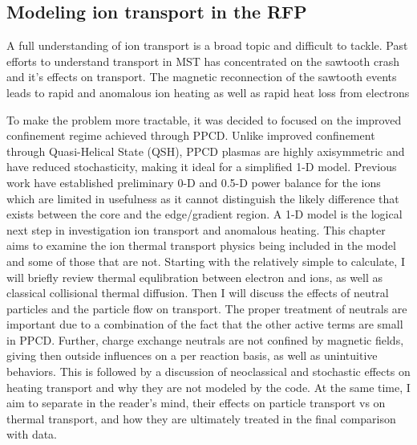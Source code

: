 \begin{refsection}


\chapter{Modeling ion transport in the RFP}\label{ch:physics}


A full understanding of ion transport is a broad topic and difficult to tackle. Past efforts to understand transport in MST has concentrated on the sawtooth crash and it's effects on transport. The magnetic reconnection of the sawtooth events leads to rapid and anomalous ion heating as well as rapid heat loss from electrons\cite{Chapman2010}

To make the problem more tractable, it was decided to focused on the improved confinement regime achieved through PPCD. Unlike improved confinement through Quasi-Helical State (QSH), PPCD plasmas are highly axisymmetric and have reduced stochasticity, making it ideal for a simplified 1-D model. Previous work have established preliminary 0-D and 0.5-D power balance for the ions\cite{??} which are limited in usefulness as it cannot distinguish the likely difference that exists between the core and the edge/gradient region. A 1-D model is the logical next step in investigation ion transport and anomalous heating. This chapter aims to examine the ion thermal transport physics being included in the model and some of those that are not. Starting with the relatively simple to calculate, I will briefly review thermal equlibration between electron and ions, as well as classical collisional thermal diffusion. Then I will discuss the effects of neutral particles and the particle flow on transport. The proper treatment of neutrals are important due to a combination of the fact that the other active terms are small in PPCD. Further, charge exchange neutrals are not confined by magnetic fields, giving then outside influences on a per reaction basis, as well as unintuitive behaviors. This is followed by a discussion of neoclassical and stochastic effects on heating transport and why they are not modeled by the code. At the same time, I aim to separate in the reader's mind, their effects on particle transport vs on thermal transport, and how they are ultimately treated in the final comparison with data. 


\end{refsection}
